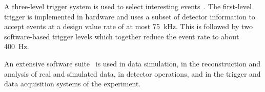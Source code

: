 A three-level trigger system is used to select interesting events~\cite{PERF-2011-02}.
The first-level trigger is implemented in hardware and uses a subset of detector information
to accept events at a design value rate of at most \qty{75}{\kHz}.
This is followed by two software-based trigger levels which together reduce the event rate to about \qty{400}{\Hz}.

An extensive software suite~\cite{ATL-SOFT-PUB-2021-001} is used in data simulation, in the reconstruction
and analysis of real and simulated data, in detector operations, and in the trigger and data acquisition
systems of the experiment.

